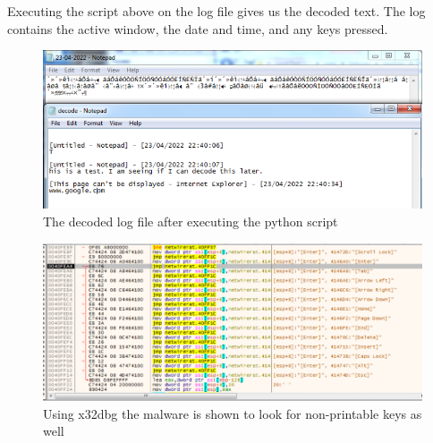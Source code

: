 \documentclass{article}
\begin{document}
    Executing the script above on the log file gives us the decoded text.     The log contains the active window, the date and time, and any keys pressed.
    \begin{figure}[H]
        \includegraphics[width=\textwidth]{decoded-logs2.png}
        \caption{The decoded log file after executing the python script}
    \end{figure}
    \begin{figure}[H]
        \includegraphics[width=\textwidth]{x32-keys.png}
        \caption{Using x32dbg the malware is shown to look for non-printable keys as well}
    \end{figure}
\end{document}
